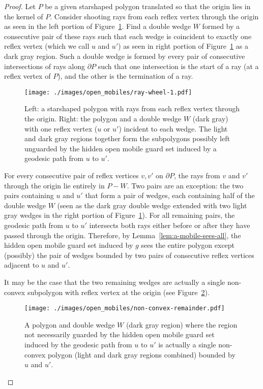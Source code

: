 \documentclass{cccg12}
\begin{document}
\begin{proof}
Let $P$ be a given starshaped polygon translated so that the origin lies in the kernel of $P$.
Consider shooting rays from each reflex vertex through the origin as seen in the left portion of Figure~\ref{fig:ray-wheel-1}.
Find a double wedge $W$ formed by a consecutive pair of these rays such that each wedge is coincident to exactly one reflex vertex (which we call $u$ and $u'$) as seen in right portion of Figure~\ref{fig:ray-wheel-1} as a dark gray region. 
Such a double wedge is formed by every pair of consecutive intersections of rays along $\partial P$ such that one intersection is the start of a ray (at a reflex vertex of $P$), and the other is the termination of a ray.

\begin{figure}[ht]
\centering
\texttt{[image: ./images/open\_mobiles/ray-wheel-1.pdf]}
\caption{Left: a starshaped polygon with rays from each reflex vertex through the origin.
Right: the polygon and a double wedge $W$ (dark gray) with one reflex vertex ($u$ or $u'$) incident to each wedge.
The light and dark gray regions together form the subpolygons possibly left unguarded by the hidden open mobile guard set induced by a geodesic path from $u$ to $u'$.}
\label{fig:ray-wheel-1}
\end{figure}

For every consecutive pair of reflex vertices $v, v'$ on $\partial P$, the rays from $v$ and $v'$ through the origin lie entirely in $P - W$.
Two pairs are an exception: the two pairs containing $u$ and $u'$ that form a pair of wedges, each containing half of the double wedge $W$ (seen as the dark gray double wedge extended with two light gray wedges in the right portion of Figure~\ref{fig:ray-wheel-1}). 
For all remaining pairs, the geodesic path from $u$ to $u'$ intersects both rays either before or after they have passed through the origin.
Therefore, by Lemma~\ref{lem:a-mobile-sees-all}, the hidden open mobile guard set induced by $g$ sees the entire polygon except (possibly) the pair of wedges bounded by two pairs of consecutive reflex vertices adjacent to $u$ and $u'$. 

It may be the case that the two remaining wedges are actually a single non-convex subpolygon with reflex vertex at the origin (see Figure~\ref{fig:non-convex-remainder}).

\begin{figure}[ht]
\centering
\texttt{[image: ./images/open\_mobiles/non-convex-remainder.pdf]}
\caption{A polygon and double wedge $W$ (dark gray region) where the region not necessarily guarded by the hidden open mobile guard set induced by the geodesic path from $u$ to $u'$ is actually a single non-convex polygon (light and dark gray regions combined) bounded by $u$ and $u'$.}
\label{fig:non-convex-remainder}
\end{figure}


\end{proof}
\end{document}
